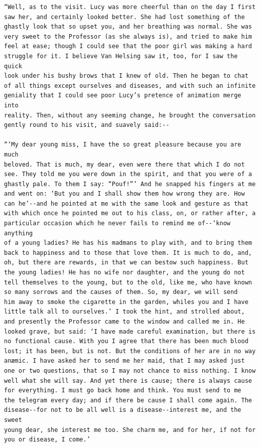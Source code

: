 \documentclass{article}
\begin{document}
\begin{verbatim}
“Well, as to the visit. Lucy was more cheerful than on the day I first
saw her, and certainly looked better. She had lost something of the
ghastly look that so upset you, and her breathing was normal. She was
very sweet to the Professor (as she always is), and tried to make him
feel at ease; though I could see that the poor girl was making a hard
struggle for it. I believe Van Helsing saw it, too, for I saw the quick
look under his bushy brows that I knew of old. Then he began to chat
of all things except ourselves and diseases, and with such an infinite
geniality that I could see poor Lucy’s pretence of animation merge into
reality. Then, without any seeming change, he brought the conversation
gently round to his visit, and suavely said:--

“‘My dear young miss, I have the so great pleasure because you are much
beloved. That is much, my dear, even were there that which I do not
see. They told me you were down in the spirit, and that you were of a
ghastly pale. To them I say: “Pouf!”’ And he snapped his fingers at me
and went on: ‘But you and I shall show them how wrong they are. How
can he’--and he pointed at me with the same look and gesture as that
with which once he pointed me out to his class, on, or rather after, a
particular occasion which he never fails to remind me of--‘know anything
of a young ladies? He has his madmans to play with, and to bring them
back to happiness and to those that love them. It is much to do, and,
oh, but there are rewards, in that we can bestow such happiness. But
the young ladies! He has no wife nor daughter, and the young do not
tell themselves to the young, but to the old, like me, who have known
so many sorrows and the causes of them. So, my dear, we will send
him away to smoke the cigarette in the garden, whiles you and I have
little talk all to ourselves.’ I took the hint, and strolled about,
and presently the Professor came to the window and called me in. He
looked grave, but said: ‘I have made careful examination, but there is
no functional cause. With you I agree that there has been much blood
lost; it has been, but is not. But the conditions of her are in no way
anæmic. I have asked her to send me her maid, that I may asked just
one or two questions, that so I may not chance to miss nothing. I know
well what she will say. And yet there is cause; there is always cause
for everything. I must go back home and think. You must send to me
the telegram every day; and if there be cause I shall come again. The
disease--for not to be all well is a disease--interest me, and the sweet
young dear, she interest me too. She charm me, and for her, if not for
you or disease, I come.’


\end{verbatim}
\end{document}
